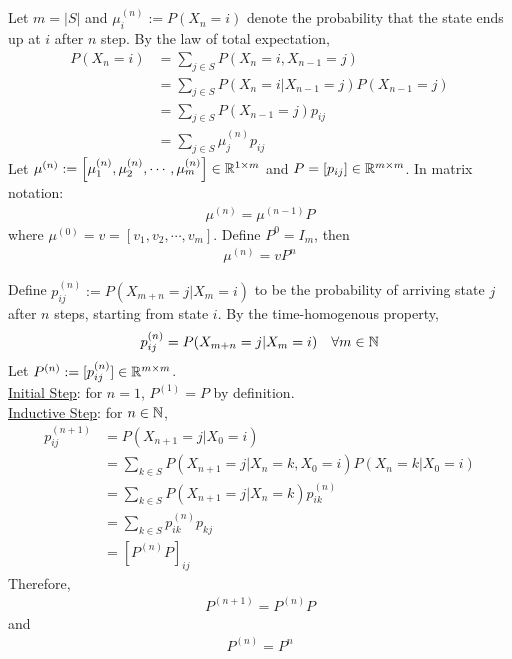 \documentclass{article}
\begin{document}
    \begin{proposition}
    	Let $m = |S|$ and $\mu_i^{(n)} := P(X_n=i)$ denote the probability that the state ends up at $i$ after $n$ step. By the law of total expectation,
    	\begin{align}
    		P(X_n=i) &= \sum_{j \in S} P(X_n=i, X_{n-1}=j) \\
    		&= \sum_{j \in S} P(X_n=i | X_{n-1}=j) P(X_{n-1}=j) \\
    		&= \sum_{j \in S} P(X_{n-1}=j) p_{ij} \\
    		&= \sum_{j \in S} \mu_{j}^{(n)} p_{ij}
    	\end{align}
    	Let $\mu^{(n)} := \left[\mu_1^{(n)}, \mu_2^{(n)}, \cdots, \mu_m^{(n)} \right] \in \mathbb{R}^{1 \times m}$ and $P = [p_{ij}] \in \mathbb{R}^{m \times m}$. In matrix notation:
    	\begin{align}
    		\mu^{(n)} = \mu^{(n-1)} P
    	\end{align}
    	where $\mu^{(0)} = v = [v_1, v_2, \cdots, v_m]$. Define $P^0 = I_m$, then
    	\begin{align}
    		\mu^{(n)} = v P^n
    	\end{align}
    \end{proposition}
    
    \begin{proposition}
    	Define $p_{ij}^{(n)} := P(X_{m+n}=j|X_{m}=i)$ to be the probability of arriving state $j$ after $n$ steps, starting from state $i$. By the time-homogenous property,
    	\begin{align}
    		p_{ij}^{(n)} = P(X_{m+n}=j|X_{m}=i)\quad \forall m \in \mathbb{N}
    	\end{align}
    	Let $P^{(n)} := [p_{ij}^{(n)}] \in \mathbb{R}^{m \times m}$. \\
    	\ul{Initial Step}: for $n = 1$, $P^{(1)} = P$ by definition. \\
    	\ul{Inductive Step}: for $n \in \mathbb{N}$,
    	\begin{align}
    		p_{ij}^{(n+1)} &= P(X_{n+1}=j|X_0=i) \\
    		&= \sum_{k \in S} P(X_{n+1}=j|X_n = k, X_0=i) P(X_n=k|X_0=i) \\
    		&= \sum_{k \in S} P(X_{n+1}=j|X_n = k) p_{ik}^{(n)} \\
    		&= \sum_{k \in S} p_{ik}^{(n)} p_{kj} \\
    		&= [P^{(n)} P]_{ij}
    	\end{align}
    	Therefore,
    	\begin{align}
    		P^{(n+1)} = P^{(n)} P
    	\end{align}
    	and 
    	\begin{align}
    		P^{(n)} = P^n
    	\end{align}
    \end{proposition}
    
\end{document}
